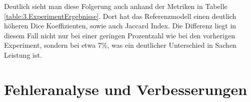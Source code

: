 Deutlich sieht man diese Folgerung auch anhand der Metriken in Tabelle \ref{table:3.ExperimentErgebnisse}. Dort hat das Referenzmodell einen deutlich höheren Dice Koeffizienten, sowie auch Jaccard Index. Die Differenz liegt in diesem Fall nicht nur bei einer geringen Prozentzahl wie bei den vorherigen Experiment, sondern bei etwa $7\%$, was ein deutlicher Unterschied in Sachen Leistung ist.



\section{Fehleranalyse und Verbesserungen}
